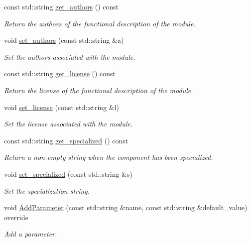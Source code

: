 \begin{DoxyCompactItemize}
$$const std\+::string \hyperlink{classmodule_ab3c59207efa504ac80ccb857947b93f6}{get\+\_\+authors} () const
\begin{DoxyCompactList}\small\item\em Return the authors of the functional description of the module. \end{DoxyCompactList}\item 
void \hyperlink{classmodule_a765b2eebf434191d207faa31dac7ea57}{set\+\_\+authors} (const std\+::string \&a)
\begin{DoxyCompactList}\small\item\em Set the authors associated with the module. \end{DoxyCompactList}\item 
const std\+::string \hyperlink{classmodule_ab552447118d780e217d9f3e38a5711cc}{get\+\_\+license} () const
\begin{DoxyCompactList}\small\item\em Return the license of the functional description of the module. \end{DoxyCompactList}\item 
void \hyperlink{classmodule_a0555b71dacade36ae76091d28854472c}{set\+\_\+license} (const std\+::string \&l)
\begin{DoxyCompactList}\small\item\em Set the license associated with the module. \end{DoxyCompactList}\item 
const std\+::string \hyperlink{classmodule_af39137fd66134483b603540dd742e9a5}{get\+\_\+specialized} () const
\begin{DoxyCompactList}\small\item\em Return a non-\/empty string when the component has been specialized. \end{DoxyCompactList}\item 
void \hyperlink{classmodule_a164a8dcd5335b2da7b0a06acdaa97daf}{set\+\_\+specialized} (const std\+::string \&s)
\begin{DoxyCompactList}\small\item\em Set the specialization string. \end{DoxyCompactList}\item 
void \hyperlink{classmodule_a08f3658653bf691cfe80c3f6db6a2e60}{Add\+Parameter} (const std\+::string \&name, const std\+::string \&default\+\_\+value) override
\begin{DoxyCompactList}\small\item\em Add a parameter. \end{DoxyCompactList}\end{DoxyCompactItemize}
